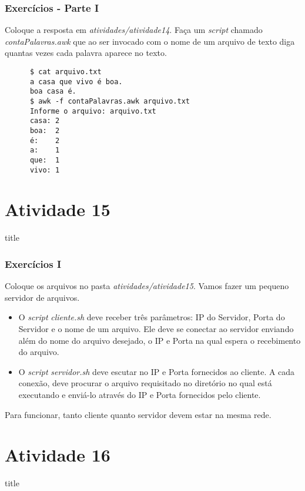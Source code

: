 \documentclass{beamer}
\begin{document}
   \begin{frame}[fragile]
      \frametitle{Exercícios - Parte I}
      Coloque a resposta em \textit{atividades/atividade14}. Faça um \textit{script} chamado \textit{contaPalavras.awk} que ao ser invocado com o nome de um arquivo de texto diga quantas vezes cada palavra aparece no texto. \\
      \begin{verbatim}
      $ cat arquivo.txt
      a casa que vivo é boa.
      boa casa é.
      $ awk -f contaPalavras.awk arquivo.txt 
      Informe o arquivo: arquivo.txt
      casa: 2
      boa:  2
      é:    2
      a:    1
      que:  1
      vivo: 1
      \end{verbatim}
\end{frame}

\section{Atividade 15}
    \begin{frame}
      \begin{beamercolorbox}[sep=8pt,center,shadow=true,rounded=true]{title}
      \insertsectionhead\par%
      \end{beamercolorbox}
   \end{frame}
 
   \begin{frame}
      \frametitle{Exercícios I}
      Coloque os arquivos no pasta \textit{atividades/atividade15}. Vamos fazer um pequeno servidor de arquivos.
      \begin{itemize}
         \item O \textit{script} \textit{cliente.sh} deve receber três parâmetros: IP do Servidor, Porta do Servidor e o nome de um arquivo. Ele deve se conectar ao servidor enviando além do nome do arquivo desejado, o IP e Porta na qual espera o recebimento do arquivo.  
	 \item O \textit{script} \textit{servidor.sh} deve escutar no IP e Porta fornecidos ao cliente. A cada conexão, deve procurar o arquivo requisitado no diretório no qual está executando e enviá-lo através do IP e Porta fornecidos pelo cliente.
     \end{itemize}
     Para funcionar, tanto cliente quanto servidor devem estar na mesma rede.
   \end{frame}

\section{Atividade 16}
    \begin{frame}
      \begin{beamercolorbox}[sep=8pt,center,shadow=true,rounded=true]{title}
      \insertsectionhead\par%
      \end{beamercolorbox}
   \end{frame}
 
\end{document}
